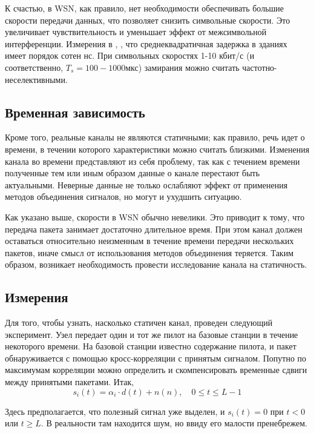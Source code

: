 \documentclass[a4paper,12pt,oneside, abstract=true]{scrartcl}
\begin{document}
К счастью, в WSN, как правило, нет необходимости обеспечивать большие скорости передачи данных, что позволяет снизить символьные скорости. 
Это увеличивает чувствительность и уменьшает эффект от межсимвольной интерференции. 
Измерения в \cite{A8}, \cite{A9}, что среднеквадратичная задержка в зданиях имеет порядок сотен нс. 
При символьных скоростях 1-10 кбит/с (и соответственно, $T_s = 100-1000$мкс) замирания можно считать частотно-неселективными.

\subsection{Временная зависимость}

Кроме того, реальные каналы не являются статичными; как правило, речь идет о времени, в течении которого характеристики можно считать близкими. 
Изменения канала во времени представляют из себя проблему, так как с течением времени полученные тем или иным образом данные о канале перестают быть актуальными. 
Неверные данные не только ослабляют эффект от применения методов объединения сигналов, но могут и ухудшить ситуацию. 

Как указано выше, скорости в WSN обычно невелики. 
Это приводит к тому, что передача пакета занимает достаточно длительное время. 
При этом канал должен оставаться относительно неизменным в течение времени передачи нескольких пакетов, иначе смысл от использования методов объединения теряется.
Таким образом, возникает необходимость провести исследование канала на статичность.
\subsection{Измерения}
Для того, чтобы узнать, насколько статичен канал, проведен следующий эксперимент. 
Узел передает один и тот же пилот на базовые станции в течение некоторого времени. 
На базовой станции известно содержание пилота, и пакет обнаруживается с помощью кросс-корреляции с принятым сигналом. 
Попутно по максимумам корреляции можно определить и скомпенсировать временные сдвиги между принятыми пакетами. 
Итак,
\begin{equation*}
s_i\left(t\right) = \alpha_i\cdot d\left(t\right)+n\left(n\right),\quad 0\leq t\leq L-1
\end{equation*}

Здесь предполагается, что полезный сигнал уже выделен, и $s_i(t) = 0$ при $t<0$ или $t\geq L$. В реальности там находится шум, но ввиду его малости пренебрежем.
\end{document}

